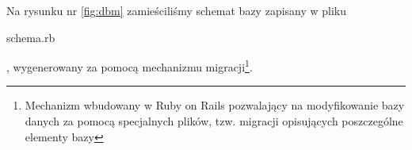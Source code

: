 Na rysunku nr \ref{fig:dbm} zamieściliśmy schemat bazy zapisany w pliku \begin{tt}{schema.rb}\end{tt}, wygenerowany za pomocą mechanizmu migracji\footnote{Mechanizm wbudowany w Ruby on Rails pozwalający na modyfikowanie bazy danych za pomocą specjalnych plików, tzw. migracji opisujących poszczególne elementy bazy\cite{rails4_way}}.

\begin{code}
  
\end{code}

